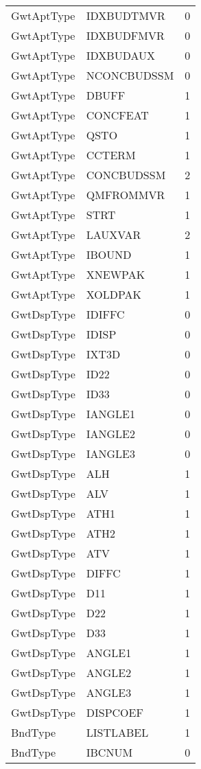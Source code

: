\begin{longtable}{p{6cm} p{4cm} p{2cm} }
GwtAptType &  IDXBUDTMVR & 0 \\ 
GwtAptType &  IDXBUDFMVR & 0 \\ 
GwtAptType &  IDXBUDAUX & 0 \\ 
GwtAptType &  NCONCBUDSSM & 0 \\ 
GwtAptType &  DBUFF & 1 \\ 
GwtAptType &  CONCFEAT & 1 \\ 
GwtAptType &  QSTO & 1 \\ 
GwtAptType &  CCTERM & 1 \\ 
GwtAptType & CONCBUDSSM & 2 \\ 
GwtAptType &  QMFROMMVR & 1 \\ 
GwtAptType &  STRT & 1 \\ 
GwtAptType &  LAUXVAR & 2 \\ 
GwtAptType &  IBOUND & 1 \\ 
GwtAptType &  XNEWPAK & 1 \\ 
GwtAptType &  XOLDPAK & 1 \\ 
GwtDspType &  IDIFFC & 0 \\ 
GwtDspType &  IDISP & 0 \\ 
GwtDspType &  IXT3D & 0 \\ 
GwtDspType &  ID22 & 0 \\ 
GwtDspType &  ID33 & 0 \\ 
GwtDspType &  IANGLE1 & 0 \\ 
GwtDspType &  IANGLE2 & 0 \\ 
GwtDspType &  IANGLE3 & 0 \\ 
GwtDspType &  ALH & 1 \\ 
GwtDspType &  ALV & 1 \\ 
GwtDspType &  ATH1 & 1 \\ 
GwtDspType &  ATH2 & 1 \\ 
GwtDspType &  ATV & 1 \\ 
GwtDspType &  DIFFC & 1 \\ 
GwtDspType &  D11 & 1 \\ 
GwtDspType &  D22 & 1 \\ 
GwtDspType &  D33 & 1 \\ 
GwtDspType &  ANGLE1 & 1 \\ 
GwtDspType &  ANGLE2 & 1 \\ 
GwtDspType &  ANGLE3 & 1 \\ 
GwtDspType &  DISPCOEF & 1 \\ 
BndType &  LISTLABEL & 1 \\ 
BndType &  IBCNUM & 0 \\ 

\end{longtable}
